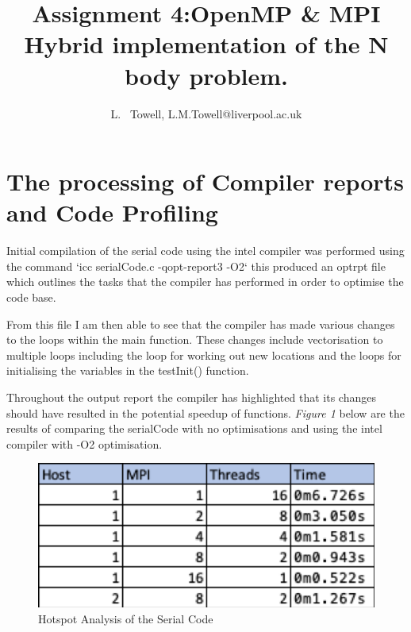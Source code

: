\documentclass[a4paper, twoside, 11pt]{article}
\author{L. ~Towell, L.M.Towell@liverpool.ac.uk}
\title{Assignment 4:\break OpenMP \& MPI Hybrid implementation of the N body problem.}
\begin{document}
	\maketitle

\maketitle
\section{The processing of Compiler reports and Code Profiling}
Initial compilation of the serial code using the intel compiler was performed using the command `icc serialCode.c -qopt-report3 -O2` this produced an optrpt file which outlines the tasks that the compiler has performed in order to optimise the code base.

From this file I am then able to see that the compiler has made various changes to the loops within the main function. These changes include vectorisation to multiple loops including the loop for working out new locations and the loops for initialising the variables in the testInit() function.

Throughout the output report the compiler has highlighted that its changes should have resulted in the potential speedup of functions. \textit{Figure 1} below are the results of comparing the serialCode with no optimisations and using the intel compiler with -O2 optimisation.

\begin{figure}[H]
	\centering
	\includegraphics[scale=0.6]{images/timings}
	\caption{Hotspot Analysis of the Serial Code}
\end{figure}
\end{document}
